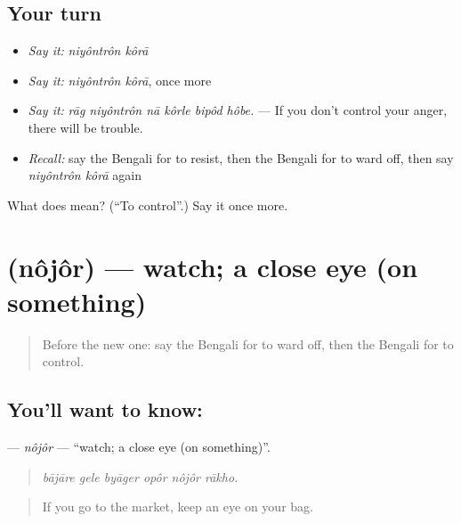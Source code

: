 \subsection*{Your turn}
\begin{itemize}
\raggedright
  \item \emph{Say it:} \emph{niyôntrôn kôrā}
  \item \emph{Say it:} \emph{niyôntrôn kôrā}, once more
  \item \emph{Say it:} \emph{rāg niyôntrôn nā kôrle bipôd hôbe.} — If you don't control your anger, there will be trouble.
  \item \emph{Recall:} say the Bengali for to resist, then the Bengali for to ward off, then say \emph{niyôntrôn kôrā} again
\end{itemize}

\begin{tcolorbox}[breakable,colback=teal!4,colframe=teal!35!black,title={Before you move on}]
What does   mean? (\textquotedblleft{}To control\textquotedblright{}.) Say it once more.
\end{tcolorbox}
\section[\texorpdfstring{\bn{নজর} (nôjôr)}{নজর (nôjôr)}]{ (nôjôr) — watch; a close eye (on something)}

\label{lesson:BN-C374-nojor}



\begin{quote}
Before the new one: say the Bengali for to ward off, then the Bengali for to control.
\end{quote}

\subsection*{You'll want to know: }
\textbf{} — \emph{nôjôr} — \textquotedblleft{}watch; a close eye (on something)\textquotedblright{}.

\begin{quote}
     
\end{quote}

\begin{quote}
\emph{bājāre gele byāger opôr nôjôr rākho.}
\end{quote}

\begin{quote}
If you go to the market, keep an eye on your bag.
\end{quote}

